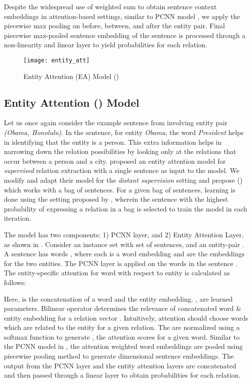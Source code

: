 \documentclass{article}
\begin{document}
Despite the widespread use of weighted sum to obtain sentence context embeddings  in attention-based settings, similar to PCNN model , we apply the piecewise max pooling on  before, between, and after the entity pair.  Final piecewise max-pooled sentence embedding  of the sentence is processed through a  non-linearity and linear layer to yield probabilities for each relation. 


\begin{figure}[t]
  \centering
\setlength{\textfloatsep}{0.30cm}
\texttt{[image: entity\_att]}
  \caption{\label{EAatt}Entity Attention (EA) Model ()}
\end{figure}

\subsection{Entity Attention (\systemea{}) Model}
\label{sec:entatt}

Let us once again consider the example sentence from  involving entity pair \textit{(Obama, Honolulu)}. In the sentence, for entity \textit{Obama}, the word \textit{President} helps in identifying that the entity is a person. This extra information helps in narrowing down the relation possibilities by looking only at the relations that occur between a person and a city. \cite{byshen:2016} proposed an entity attention model for \emph{supervised} relation extraction with a single sentence as input to the model. We modify and adapt their model for the \emph{distant supervision} setting and propose \systemeafull{} (\systemea{}) which works with a bag of sentences. For a given bag of sentences, learning is done using the setting proposed by \cite{zeng:2015}, wherein the sentence with the highest probability of expressing a relation in a bag is selected to train the model in each iteration.

The \systemea{} model has two components: 1) PCNN layer, and 2) Entity Attention Layer, as shown in  . Consider an instance set  with set of sentences,  and an entity-pair . A sentence  has  words , where each  is a word embedding and  are the embeddings for the two entities. The PCNN layer is applied on the words in the sentence \cite{zeng:2015}. The entity-specific attention  for  word with respect to  entity is calculated as follows:

Here,  is the concatenation of a word and the entity embedding. ,  are learned parameters. Bilinear operator  determines the relevance of concatenated word \& entity embedding for a relation vector . Intuitively, attention should choose words which are related to the entity for a given relation. The  are normalized using a softmax function to generate , the attention scores for a given word. Similar to the PCNN model in , the attention weighted word embeddings are pooled using piecewise pooling method to generate  dimensional sentence embeddings. The output from the PCNN layer and the entity attention layers are concatenated and then passed through a linear layer to obtain probabilities for each relation.
\end{document}
